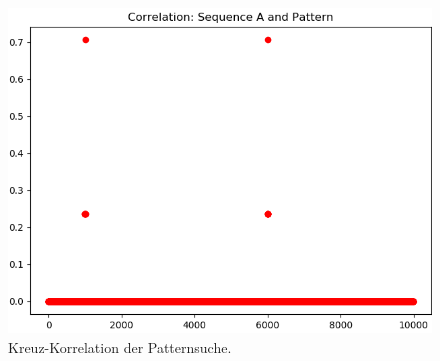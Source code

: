 \begin{figure}[H]
  \includegraphics[width=\linewidth]{./images/patternsearchCorrelation.PNG}
  \caption[Patternsuche: Kreuz-Korrelation]{Kreuz-Korrelation der Patternsuche\footnotemark.}
  \label{fig:patternsearchCorrelation}
\end{figure}

